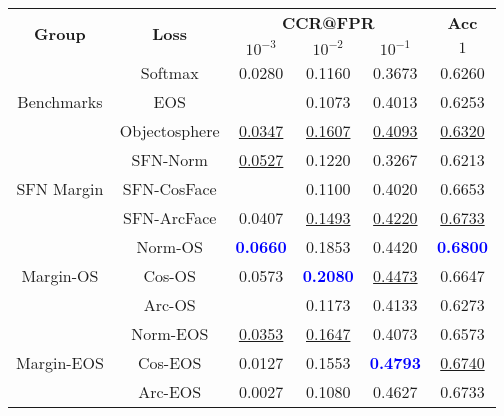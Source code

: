 \begin{tabularx}{.7\textwidth}{|c|c||ccc|c|}
\cline{1-6}
\multirow{2}{*}{\bf Group} & \multirow{2}{*}{\bf Loss} & \multicolumn{3}{c|}{\bf CCR@FPR} & \bf {Acc} \\ \cline{3-6}
& &$10^{-3}$ & $10^{-2}$ & $10^{-1}$ & $1$\\\cline{1-6}\cline{1-6}
\multirow{3}{*}{Benchmarks} & Softmax & 0.0280 & 0.1160 & 0.3673 & 0.6260\\
 & EOS & & 0.1073 & 0.4013 & 0.6253\\
 & Objectosphere & \underline {0.0347} & \underline {0.1607} & \underline {0.4093} & \underline {0.6320}\\
\cline{1-6}
\multirow{3}{*}{SFN Margin} & SFN-Norm & \underline {0.0527} & 0.1220 & 0.3267 & 0.6213\\
 & SFN-CosFace & & 0.1100 & 0.4020 & 0.6653\\
 & SFN-ArcFace & 0.0407 & \underline {0.1493} & \underline {0.4220} & \underline {0.6733}\\
\cline{1-6}
\multirow{3}{*}{Margin-OS} & Norm-OS & \textcolor{blue}{\bf 0.0660} & 0.1853 & 0.4420 & \textcolor{blue}{\bf 0.6800}\\
 & Cos-OS & 0.0573 & \textcolor{blue}{\bf 0.2080} & \underline {0.4473} & 0.6647\\
 & Arc-OS & & 0.1173 & 0.4133 & 0.6273\\
\cline{1-6}
\multirow{3}{*}{Margin-EOS} & Norm-EOS & \underline {0.0353} & \underline {0.1647} & 0.4073 & 0.6573\\
 & Cos-EOS & 0.0127 & 0.1553 & \textcolor{blue}{\bf 0.4793} & \underline {0.6740}\\
 & Arc-EOS & 0.0027 & 0.1080 & 0.4627 & 0.6733\\
\cline{1-6}
\end{tabularx}
